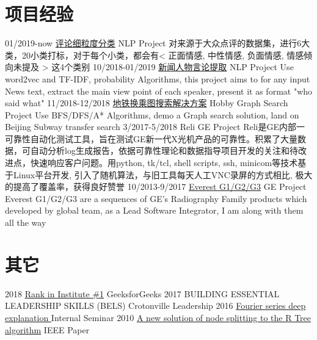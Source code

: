 \documentclass[letterpaper,10pt]{Resume_Liang}
\begin{document}
\begin{body}
\section{项目经验}
\begin{entrylist}
 \projectentry
  {01/2019-now}
  {\href{https://github.com/Artificial-Intelligence-for-NLP-and-CV/comment-setimental-classification}{评论细粒度分类}}
  {NLP Project}
  {对来源于大众点评的数据集，进行6大类，20小类打标，对于每个小类，都会有< 正面情感, 中性情感, 负面情感, 情感倾向未提及 > 这4个类别}
  \projectentry
    {10/2018-01/2019}
    {\href{https://github.com/wangliangster/TestWL/blob/master/ViewPointExtract.ipynb}{新闻人物言论提取}}
    {NLP Project}
    {Use word2vec and TF-IDF, probability Algorithms, this project aims to for any input News text, extract the main view point of each speaker, present it as format "who said what" }
  \projectentry
    {11/2018-12/2018}
    {\href{https://github.com/wangliangster/NLP-Course/blob/master/BeijingSubway.ipynb}{地铁换乘图搜索解决方案}}
    {Hobby Graph Search Project}
    {Use BFS/DFS/A* Algorithms, demo a Graph search solution, land on Beijing Subway transfer search}
    \projectentry
    {3/2017-5/2018}
    {Reli}
    {GE Project}
    {Reli是GE内部一可靠性自动化测试工具，旨在测试GE新一代X光机产品的可靠性。积累了大量数据，可自动分析log生成报告，依据可靠性理论和数据指导项目开发的关注和待改进点，快速响应客户问题。用python, tk/tcl, shell scripts, ssh, minicom等技术基于Linux平台开发, 引入了随机算法，与旧工具每天人工VNC录屏的方式相比, 极大的提高了覆盖率，获得良好赞誉}
     \projectentry
    {10/2013-9/2017}
    {\href{https://www.gehealthcare.com/en/products/radiography/fixed-rad-systems}{Everest G1/G2/G3}}
    {GE Project}
    {Everest G1/G2/G3 are a sequences of GE's Radiography Family products which developed by global team, as a Lead Software Integrator, I am along with them all the way  }
\end{entrylist}

\section{其它}
\begin{entrylist}
   \otherentry
   {2018}
   {\href{https://auth.geeksforgeeks.org/user/\%E7\%8E\%8B\%E8\%89\%AF/practice/}{Rank in Institute \#1}}
   {GeeksforGeeks}
    \otherentry
    {2017}
    {BUILDING ESSENTIAL LEADERSHIP SKILLS (BELS) }
    {Crotonville Leadership}
     \otherentry
    {2016}
    {\href{https://github.com/wangliangster/TestWL/blob/master/Fouries\%20Transfer\%20Notes3.pdf}{Fourier series deep explanation }}
    {Internal Seminar }
    \otherentry
    {2010}
    {\href{https://ieeexplore.ieee.org/document/5564214}{A new solution of node splitting to the R Tree algorithm}}
    {IEEE Paper}
\end{entrylist}
\end{body}
\end{document}
